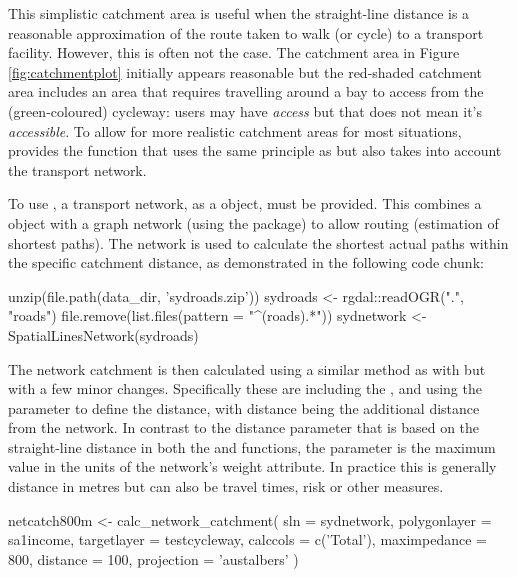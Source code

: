 This simplistic catchment area is useful when the straight-line distance
is a reasonable approximation of the route taken to walk (or cycle) to a
transport facility. However, this is often not the case. The catchment
area in Figure \ref{fig:catchmentplot} initially appears reasonable but
the red-shaded catchment area includes an area that requires travelling
around a bay to access from the (green-coloured) cycleway:
users may have \emph{access} but that does not mean it's \emph{accessible}. To allow for
more realistic catchment areas for most situations, 
provides the  function that uses the
same principle as  but also takes into account
the transport network.

To use , a transport network,
as a  object, must be provided. This combines a
 object with a graph network (using the
 package) to allow routing (estimation of shortest paths).
The network is used to calculate the shortest actual paths within the
specific catchment distance, as demonstrated in the following code chunk:

\begin{Schunk}
\begin{Sinput}
unzip(file.path(data_dir, 'sydroads.zip'))
sydroads <- rgdal::readOGR(".", "roads")
file.remove(list.files(pattern = "^(roads).*"))
sydnetwork <- SpatialLinesNetwork(sydroads)
\end{Sinput}
\end{Schunk}

The network catchment is then calculated using a similar method as with
 but with a few minor changes. Specifically
these are including the , and using the
 parameter to define the distance, with distance
being the additional distance from the network. In contrast to the
distance parameter that is based on the straight-line distance in both
the  and 
functions, the  parameter is the maximum value in
the units of the network's weight attribute. In practice this is
generally distance in metres but can also be travel times, risk or other
measures.

\begin{Schunk}
\begin{Sinput}
netcatch800m <- calc_network_catchment(
  sln = sydnetwork,
  polygonlayer = sa1income,
  targetlayer = testcycleway,
  calccols = c('Total'),
  maximpedance = 800,
  distance = 100,
  projection = 'austalbers'
)
\end{Sinput}
\end{Schunk}

